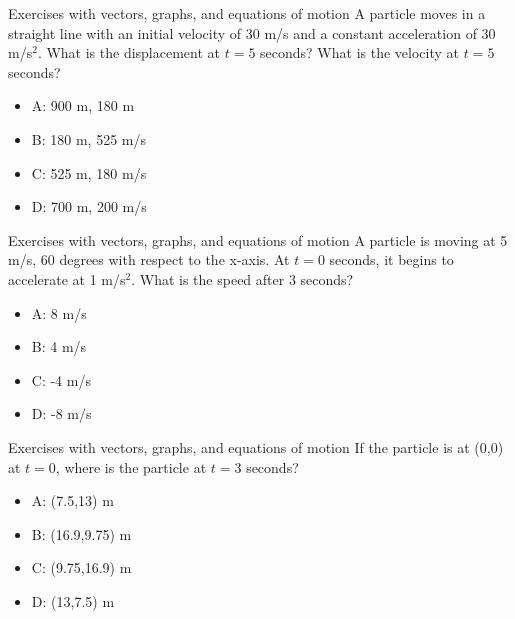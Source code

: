 \documentclass{beamer}
\begin{document}
\begin{frame}{Exercises with vectors, graphs, and equations of motion}
A particle moves in a straight line with an initial velocity of 30 m/s and a constant acceleration of 30 m/s$^2$.  What is the displacement at $t=5$ seconds?  What is the velocity at $t=5$ seconds? \\
\begin{itemize}
\item A: 900 m, 180 m
\item B: 180 m, 525 m/s
\item C: 525 m, 180 m/s
\item D: 700 m, 200 m/s
\end{itemize}
\end{frame}

\begin{frame}{Exercises with vectors, graphs, and equations of motion}
A particle is moving at 5 m/s, 60 degrees with respect to the x-axis.  At $t=0$ seconds, it begins to accelerate at 1 m/s$^2$.  What is the speed after 3 seconds?\\
\begin{itemize}
\item A: 8 m/s
\item B: 4 m/s
\item C: -4 m/s
\item D: -8 m/s 
\end{itemize}
\end{frame}

\begin{frame}{Exercises with vectors, graphs, and equations of motion}
If the particle is at (0,0) at $t=0$, where is the particle at $t=3$ seconds? \\
\begin{itemize}
\item A: (7.5,13) m
\item B: (16.9,9.75) m
\item C: (9.75,16.9) m
\item D: (13,7.5) m 
\end{itemize}
\end{frame}
\end{document}
